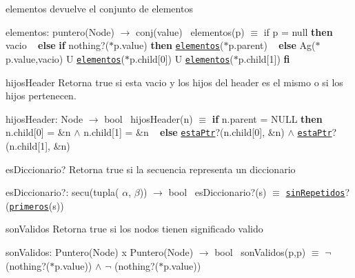 \begin{DoxyParagraph}{elementos}
devuelve el conjunto de elementos

elementos\+: puntero(\+Node) $\to$ conj(value)~\newline
 elementos(p) $\equiv$ if p = null {\bfseries then} vacio ~\newline
 {\bfseries else} {\bfseries if} nothing?($\ast$p.value) {\bfseries then} \href{axiomas.html#elementos}{\tt elementos}($\ast$p.parent) ~\newline
 {\bfseries else} Ag($\ast$p.value,vacio) U \href{axiomas.html#elementos}{\tt elementos}($\ast$p.child\mbox{[}0\mbox{]}) U \href{axiomas.html#elementos}{\tt elementos}($\ast$p.child\mbox{[}1\mbox{]}) {\bfseries fi} 
\end{DoxyParagraph}


\begin{DoxyParagraph}{hijos\+Header}
Retorna true si esta vacio y los hijos del header es el mismo o si los hijos pertenecen.

hijos\+Header\+: Node $\to$ bool~\newline
 hijos\+Header(n) $\equiv$ {\bfseries if} n.\+parent = N\+U\+LL {\bfseries then} n.\+child\mbox{[}0\mbox{]} = \&n $\land$ n.\+child\mbox{[}1\mbox{]} = \&n ~\newline
 {\bfseries else} \href{axiomas.html#estaPtr}{\tt esta\+Ptr}?(n.\+child\mbox{[}0\mbox{]}, \&n) $\land$ \href{axiomas.html#estaPtr}{\tt esta\+Ptr}?(n.\+child\mbox{[}1\mbox{]}, \&n) 
\end{DoxyParagraph}


\begin{DoxyParagraph}{es\+Diccionario?}
Retorna true si la secuencia representa un diccionario

es\+Diccionario?\+: secu(tupla( $\alpha$, $\beta$)) $\to$ bool~\newline
 es\+Diccionario?(s) $\equiv$ \href{axiomas.html#sinRepetidos}{\tt sin\+Repetidos}?(\href{axiomas.html#primeros}{\tt primeros}(s)) 
\end{DoxyParagraph}


\begin{DoxyParagraph}{son\+Validos}
Retorna true si los nodos tienen significado valido

son\+Validos\+: Puntero(\+Node) x Puntero(\+Node) $\to$ bool~\newline
 son\+Validos(p,p\textquotesingle{}) $\equiv$ $\lnot$ (nothing?($\ast$p.value)) $\land$ $\lnot$ (nothing?($\ast$p\textquotesingle{}.value)) 
\end{DoxyParagraph}


